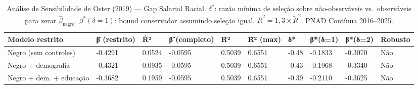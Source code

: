 \begin{table}
\caption{Análise de Sensibilidade de Oster (2019) --- Gap Salarial Racial. $\delta^*$: razão mínima de seleção sobre não-observáveis vs.\ observáveis para zerar $\hat{\beta}_{\text{negro}}$. $\beta^*(\delta{=}1)$: bound conservador assumindo seleção igual. $\bar{R}^2 = 1{,}3 \times \tilde{R}^2$. PNAD Contínua 2016--2025.}
\label{tab:oster_bounds}
\begin{tabular}{llllllllll}
\toprule
Modelo restrito & β̇ (restrito) & Ṙ² & β̃ (completo) & R̃² & R̄² (max) & δ* & β*(δ=1) & β*(δ=2) & Robusto \\
\midrule
Negro (sem controles) & -0.4291 & 0.0524 & -0.0595 & 0.5039 & 0.6551 & -0.48 & -0.1833 & -0.3070 & Não \\
Negro + demografia & -0.4321 & 0.0935 & -0.0595 & 0.5039 & 0.6551 & -0.43 & -0.1968 & -0.3340 & Não \\
Negro + dem. + educação & -0.3682 & 0.1959 & -0.0595 & 0.5039 & 0.6551 & -0.39 & -0.2110 & -0.3625 & Não \\
\bottomrule
\end{tabular}
\end{table}
